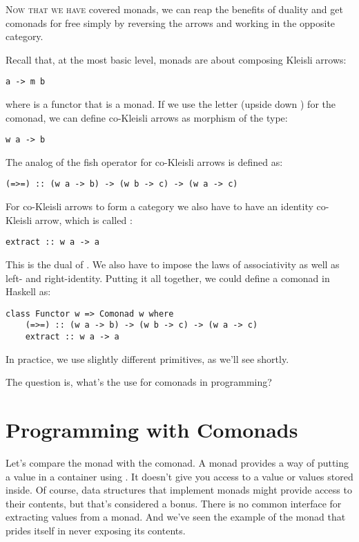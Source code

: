 \lettrine[lhang=0.17]{N}{ow that we have} covered monads, we can reap the benefits of duality and
get comonads for free simply by reversing the arrows and working in the
opposite category.

Recall that, at the most basic level, monads are about composing Kleisli
arrows:

\begin{verbatim}
a -> m b
\end{verbatim}
where  is a functor that is a monad. If we use the letter
 (upside down ) for the comonad, we can define
co-Kleisli arrows as morphism of the type:

\begin{verbatim}
w a -> b
\end{verbatim}
The analog of the fish operator for co-Kleisli arrows is defined as:

\begin{verbatim}
(=>=) :: (w a -> b) -> (w b -> c) -> (w a -> c)
\end{verbatim}
For co-Kleisli arrows to form a category we also have to have an
identity co-Kleisli arrow, which is called :

\begin{verbatim}
extract :: w a -> a
\end{verbatim}
This is the dual of . We also have to impose the laws of
associativity as well as left- and right-identity. Putting it all
together, we could define a comonad in Haskell as:

\begin{verbatim}
class Functor w => Comonad w where
    (=>=) :: (w a -> b) -> (w b -> c) -> (w a -> c)
    extract :: w a -> a
\end{verbatim}
In practice, we use slightly different primitives, as we'll see shortly.

The question is, what's the use for comonads in programming?

\section{Programming with Comonads}\label{programming-with-comonads}

Let's compare the monad with the comonad. A monad provides a way of
putting a value in a container using . It doesn't give
you access to a value or values stored inside. Of course, data
structures that implement monads might provide access to their contents,
but that's considered a bonus. There is no common interface for
extracting values from a monad. And we've seen the example of the
 monad that prides itself in never exposing its contents.

